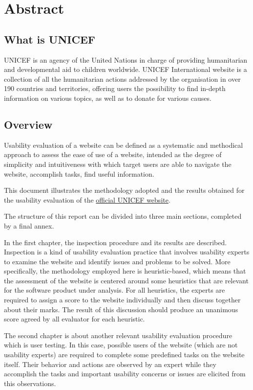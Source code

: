 
\section{Abstract}

\subsection{What is UNICEF}
UNICEF is an agency of the United Nations in charge of providing humanitarian and developmental aid to children worldwide. UNICEF International website is a collection of all the humanitarian actions addressed by the organisation in over 190 countries and territories, offering users the possibility to find in-depth information on various topics, as well as to donate for various causes.

\subsection{Overview}
Usability evaluation of a website can be defined as a systematic and methodical approach to assess the ease of use of a website, intended as the degree of simplicity and intuitiveness with which target users are able to navigate the website, accomplish tasks, find useful information.

This document illustrates the methodology adopted and the results obtained for the usability evaluation of the \href{https://www.unicef.org/}{official UNICEF website}.

The structure of this report can be divided into three main sections, completed by a final annex.

In the first chapter, the inspection procedure and its results are described. Inspection is a kind of usability evaluation practice that involves usability experts to examine the website and identify issues and problems to be solved. More specifically, the methodology employed here is heuristic-based, which means that the assessment of the website is centered around some heuristics that are relevant for the software product under analysis. 
For all heuristics, the experts are required to assign a score to the website individually and then discuss together about their marks. The result of this discussion should produce an unanimous score agreed by all evaluator for each heuristic.

The second chapter is about another relevant usability evaluation procedure which is user testing. In this case, possible users of the website (which are not usability experts) are required to complete some predefined tasks on the website itself. Their behavior and actions are observed by an expert while they accomplish the tasks and important usability concerns or issues are elicited from this observations.

